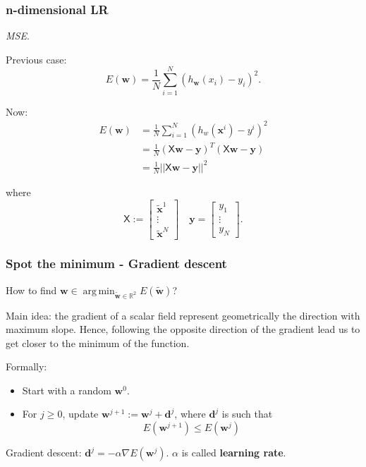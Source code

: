 \documentclass{beamer}
\DeclareMathOperator*{\argmin}{arg\,min}
\begin{document}
	\begin{frame}
		\frametitle{n-dimensional LR}
		\textsl{MSE}.
		
		Previous case: 
		\begin{equation*}
			E(\bm{w}) = \frac{1}{N} \sum_{i=1}^{N} (h_{\bm{w}}(x_i) - y_i)^2.
		\end{equation*}
		
		\vspace{1 mm}
		
		Now: 
		\begin{align*}
			E(\bm{w}) &= \frac{1}{N} \sum_{i=1}^{N} (h_w(\bm{x}^i) - y^i)^2\\
			&= \frac{1}{N} (\mathsf{X} \bm{w} - \bm{y})^T (\mathsf{X}\bm{w} - \bm{y})\\
			&= \frac{1}{N} ||\mathsf{X}\bm{w} - \bm{y}||^2
		\end{align*}
		
		where
		\begin{equation*}
			\mathsf{X} := \begin{bmatrix}
				\tilde{\bm{x}}^1\\
				\vdots\\
				\tilde{\bm{x}}^N 
			\end{bmatrix} \quad \bm{y} = \begin{bmatrix}
			y_1 \\
			\vdots\\
			y_N
		\end{bmatrix}.
		\end{equation*}
	\end{frame}

	\begin{frame}
		\frametitle{Spot the minimum - Gradient descent}
		How to find $\bm{w} \in \argmin_{\tilde{\bm{w}} \in \mathbb{R}^2} E(\tilde{\bm{w}})$?
		
		\vspace{5mm}
		
		Main idea: the gradient of a scalar field represent geometrically the direction with maximum slope. Hence, following the opposite direction of the gradient lead us to get closer to the minimum of the function.
		
		\vspace{5mm}
		
		Formally:
		\begin{itemize}
			\item Start with a random $\bm{w}^0$.
			\item For $j \geq 0$, update $\bm{w}^{j+1} := \bm{w}^{j} + \bm{d}^j$, where $\bm{d}^j$ is such that
			\begin{equation*}
				E(\bm{w}^{j+1}) \leq E(\bm{w}^j) 
			\end{equation*}
		\end{itemize}
		Gradient descent: $\bm{d}^j = - \alpha \nabla E(\bm{w}^j)$. $\alpha$ is called \textbf{learning rate}.
	\end{frame}
\end{document}
